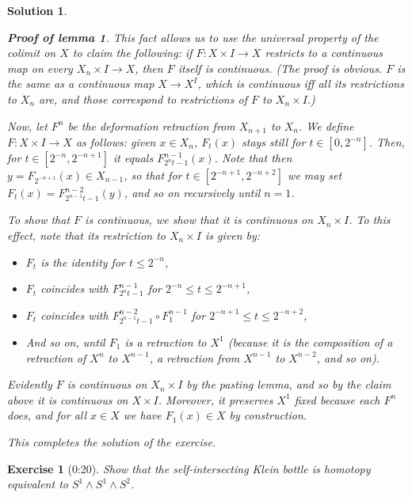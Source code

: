 \documentclass{article}
\theoremstyle{plain}
\newtheorem*{ex}{Exercise}
\theoremstyle{nonumberplain}
\newtheorem{sol}{Solution}
\newtheorem{lemmaproof}{Proof of lemma}
\begin{document}
\begin{sol}
\begin{lemmaproof}
This fact allows us to use the universal property of the colimit on $X$ to claim the following: if $F \colon X \times I \to X$ restricts to a continuous map on every $X_n \times I \to X$, then $F$ itself is continuous. (The proof is obvious. $F$ is the same as a continuous map $X \to X^I$, which is continuous iff all its restrictions to $X_n$ are, and those correspond to restrictions of $F$ to $X_n \times I$.)

Now, let $F^n$ be the deformation retraction from $X_{n+1}$ to $X_n$. We define $F \colon X \times I \to X$ as follows: given $x \in X_n$, $F_t(x)$ stays still for $t \in [0,2^{-n}]$. Then, for $t \in [2^{-n}, 2^{-n+1}]$ it equals $F^{n-1}_{2^n t - 1}(x)$. Note that then $y = F_{2^{-n+1}}(x) \in X_{n-1}$, so that for $t \in [2^{-n+1}, 2^{-n+2}]$ we may set $F_t(x) = F^{n-2}_{2^{n-1} t - 1}(y)$, and so on recursively until $n = 1$.

To show that $F$ is continuous, we show that it is continuous on $X_n \times I$. To this effect, note that its restriction to $X_n \times I$ is given by:
\begin{itemize}
\item $F_t$ is the identity for $t \leq 2^{-n}$,
\item $F_t$ coincides with $F^{n-1}_{2^n t - 1}$ for $2^{-n} \leq t \leq 2^{-n+1}$,
\item $F_t$ coincides with $F^{n-2}_{2^{n-1} t - 1} \circ F^{n-1}_1$ for $2^{-n+1} \leq t \leq 2^{-n+2}$,
\item And so on, until $F_1$ is a retraction to $X^1$ (because it is the composition of a retraction of $X^n$ to $X^{n-1}$, a retraction from $X^{n-1}$ to $X^{n-2}$, and so on).
\end{itemize}

Evidently $F$ is continuous on $X_n \times I$ by the pasting lemma, and so by the claim above it is continuous on $X \times I$. Moreover, it preserves $X^1$ fixed because each $F^n$ does, and for all $x \in X$ we have $F_1(x) \in X$ by construction.
\end{lemmaproof}

This completes the solution of the exercise.
\end{sol}

\begin{ex}[0:20]
Show that the self-intersecting Klein bottle is homotopy equivalent to $S^1 \wedge S^1 \wedge S^2$.
\end{ex}
\end{document}
